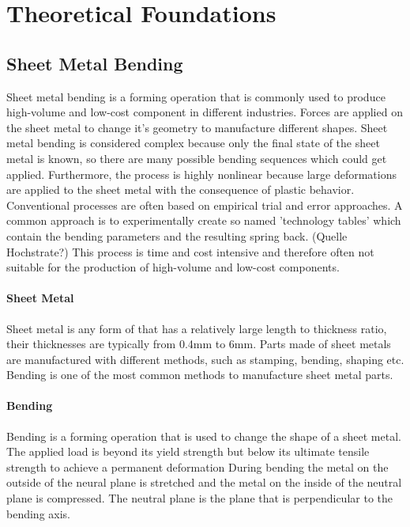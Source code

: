 \chapter{Theoretical Foundations}

\section{Sheet Metal Bending}
Sheet metal bending is a forming operation that is commonly used to produce high-volume and low-cost component in different industries. Forces are applied on the sheet metal to change it's geometry to manufacture different shapes. 
\cite[p. 1]{dib_singleensembleclassifiers_2020}
Sheet metal bending is considered complex because only the final state of the sheet metal is known, so there are many possible bending sequences which could get applied. Furthermore, the process is highly nonlinear because large deformations are applied to the sheet metal with the consequence of plastic behavior.
Conventional processes are often based on empirical trial and error approaches. \cite[p. 1]{dib_singleensembleclassifiers_2020}
A common approach is to experimentally create so named 'technology tables' which contain the bending parameters and the resulting spring back. (Quelle Hochstrate?)
This process is time and cost intensive and therefore often not suitable for the production of high-volume and low-cost components.

\subsubsection{Sheet Metal}
Sheet metal is any form of that has a relatively large length to thickness ratio, their thicknesses are typically from 0.4mm to 6mm.  %
\cite[]{baig_machinelearningprediction_2021}
Parts made of sheet metals are manufactured with different methods, such as stamping, bending, shaping etc. Bending is one of the most common methods to manufacture sheet metal parts. %

\subsubsection{Bending}
Bending is a forming operation that is used to change the shape of a sheet metal. The applied load is beyond its yield strength but below its ultimate tensile strength to achieve a permanent deformation \cite[p. 1]{baig_machinelearningprediction_2021}
During bending the metal on the outside of the neural plane is stretched and the metal on the inside of the neutral plane is compressed. The neutral plane is the plane that is perpendicular to the bending axis. \cite[p. 3]{baig_machinelearningprediction_2021}

